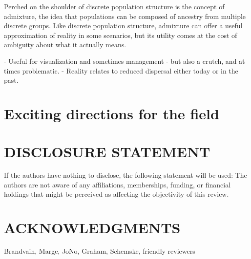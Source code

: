 \documentclass{ar-1col}
\begin{document}
Perched on the shoulder of discrete population structure is the concept of admixture,
the idea that populations can be composed of ancestry from multiple discrete groups.
Like discrete population structure,
admixture can offer a useful approximation of reality in some scenarios,
but its utility comes at the cost of ambiguity about what it actually means.

    - Useful for visualization and sometimes management
    - but also a crutch, and at times problematic.
    - Reality relates to reduced dispersal either today or in the past.


\section{Exciting directions for the field}

\section*{DISCLOSURE STATEMENT}
If the authors have nothing to disclose, the following statement will be used: The authors are not aware of any affiliations, memberships, funding, or financial holdings that
might be perceived as affecting the objectivity of this review.

\section*{ACKNOWLEDGMENTS}
Brandvain, Marge, JoNo, Graham, Schemske, friendly reviewers
\end{document}
